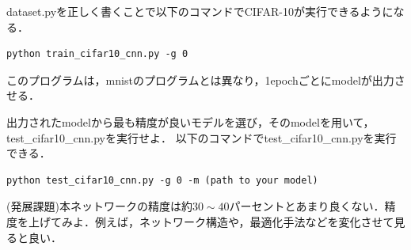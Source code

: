 dataset.pyを正しく書くことで以下のコマンドでCIFAR-10が実行できるようになる．
\begin{lstlisting}[basicstyle=\ttfamily\footnotesize, frame=single]
python train_cifar10_cnn.py -g 0
\end{lstlisting}
このプログラムは，mnistのプログラムとは異なり，1epochごとにmodelが出力させる．
\begin{practice}
出力されたmodelから最も精度が良いモデルを選び，そのmodelを用いて，test\_cifar10\_cnn.pyを実行せよ．
以下のコマンドでtest\_cifar10\_cnn.pyを実行できる．
\begin{lstlisting}[basicstyle=\ttfamily\footnotesize, frame=single]
python test_cifar10_cnn.py -g 0 -m (path to your model)
\end{lstlisting}
\end{practice}

\begin{practice}
(発展課題)本ネットワークの精度は約$30\sim 40$パーセントとあまり良くない．精度を上げてみよ．例えば，ネットワーク構造や，最適化手法などを変化させて見ると良い．
\end{practice}
